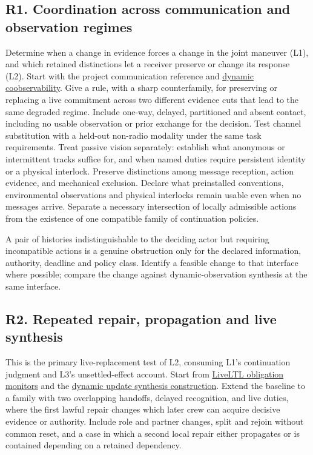 \documentclass[11pt]{article}
\begin{document}
\subsection*{R1. Coordination across communication and observation regimes}
Determine when a change in evidence forces a change in the joint maneuver (L1), and which retained distinctions let a receiver preserve or change its response (L2). Start with the project communication reference and \href{https://xiangyin.sjtu.edu.cn/Paper/15Automatica.pdf}{dynamic coobservability}. Give a rule, with a sharp counterfamily, for preserving or replacing a live commitment across two different evidence cuts that lead to the same degraded regime. Include one-way, delayed, partitioned and absent contact, including no usable observation or prior exchange for the decision. Test channel substitution with a held-out non-radio modality under the same task requirements. Treat passive vision separately: establish what anonymous or intermittent tracks suffice for, and when named duties require persistent identity or a physical interlock. Preserve distinctions among message reception, action evidence, and mechanical exclusion. Declare what preinstalled conventions, environmental observations and physical interlocks remain usable even when no messages arrive. Separate a necessary intersection of locally admissible actions from the existence of one compatible family of continuation policies.

A pair of histories indistinguishable to the deciding actor but requiring incompatible actions is a genuine obstruction only for the declared information, authority, deadline and policy class. Identify a feasible change to that interface where possible; compare the change against dynamic-observation synthesis at the same interface.

\subsection*{R2. Repeated repair, propagation and live synthesis}
This is the primary live-replacement test of L2, consuming L1's continuation judgment and L3's unsettled-effect account. Start from \href{https://pmc.ncbi.nlm.nih.gov/articles/PMC9468080/}{LiveLTL obligation monitors} and the \href{https://smlab.cs.tau.ac.il/syntech/dupdate/dupdate-icse22-cr.pdf}{dynamic update synthesis construction}. Extend the baseline to a family with two overlapping handoffs, delayed recognition, and live duties, where the first lawful repair changes which later crew can acquire decisive evidence or authority. Include role and partner changes, split and rejoin without common reset, and a case in which a second local repair either propagates or is contained depending on a retained dependency.
\end{document}
